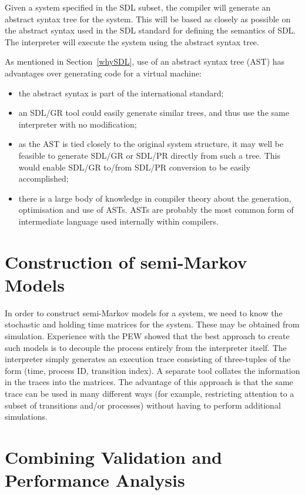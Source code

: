 Given a system specified in the SDL subset, the compiler will generate an
abstract syntax tree for the system. This will be based as closely as
possible on the abstract syntax used in the SDL standard for defining the
semantics of SDL. The interpreter will execute the system using the
abstract syntax tree.

As mentioned in Section~\ref{whySDL}, use of an abstract syntax tree
(AST) has advantages over
generating code for a virtual machine:

\begin{itemize}
\item the abstract syntax is part of the international standard;
\item an SDL/GR tool could easily generate similar trees, and thus use
the same interpreter with no modification;
\item as the AST is tied closely to the original system structure, it may
well be feasible to generate SDL/GR or SDL/PR directly from such a tree.
This would enable SDL/GR to/from SDL/PR conversion to be easily
accomplished;
\item there is a large body of knowledge in compiler theory about the
generation, optimisation and use of ASTs. ASTs are probably the most common
form of intermediate language used internally within compilers.
\end{itemize}

\section{Construction of semi-Markov Models}

In order to construct semi-Markov models for a system, we need to know the
stochastic and holding time matrices for the system. These may be obtained
from simulation. Experience with the PEW showed that the best approach to 
create such models is to decouple the process entirely from the interpreter
itself. The interpreter simply generates an execution trace consisting of
three-tuples of the form (time, process ID, transition index). A separate
tool collates the information in the traces into the matrices. The
advantage of this approach is that the same trace can be used in many
different ways (for example, restricting attention to a subset of
transitions and/or processes) without having to perform additional
simulations.

\section{Combining Validation and Performance Analysis}

